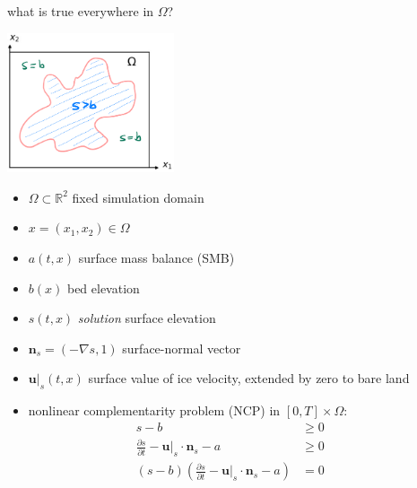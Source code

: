 \documentclass[10pt,dvipsnames]{beamer}
\newcommand{\bn}{\mathbf{n}}
\newcommand{\bu}{\mathbf{u}}
\newcommand{\RR}{\mathbb{R}}
\newcommand{\grad}{\nabla}
\begin{document}
\begin{frame}{what is true everywhere in $\Omega$?}

\hfill \includegraphics[width=0.37\textwidth]{mapplane}

\vspace{-40mm}

\begin{minipage}[t]{60mm}
{\small
\begin{itemize}
\item $\Omega \subset \RR^2$ fixed simulation domain
\item $x = (x_1,x_2) \in \Omega$
\item $a(t,x)$ surface mass balance (SMB)
\item $b(x)$ bed elevation
\item $s(t,x)$ \emph{solution} surface elevation
\item $\bn_s = (- \grad s,1)$ surface-normal vector
\item $\bu|_s(t,x)$ surface value of ice velocity, extended by zero to bare land
\end{itemize}
}
\end{minipage}

\begin{itemize}
\item nonlinear complementarity problem (NCP) in $[0,T] \times \Omega$:
\begin{align*}
s - b &\ge 0 &&\phantom{x} \\
\frac{\partial s}{\partial t} - \bu|_s \cdot \bn_s - a &\ge 0 \\
(s - b) \left(\frac{\partial s}{\partial t} - \bu|_s \cdot \bn_s - a\right) &= 0
\end{align*}
\end{itemize}
\end{frame}
\end{document}
